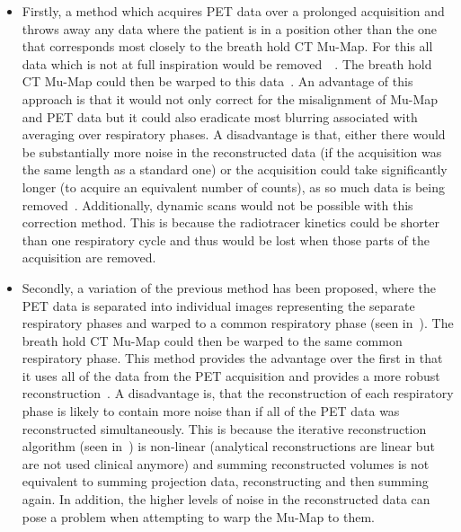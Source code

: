             \begin{itemize}
                \item Firstly, a method which acquires \gls{PET} data over a prolonged acquisition and throws away any data where the patient is in a position other than the one that corresponds most closely to the breath hold \gls{CT} \gls{Mu-Map}. For this all data which is not at full inspiration would be removed~~. %
                The breath hold \gls{CT} \gls{Mu-Map} could then be warped to this data~. An advantage of this approach is that it would not only correct for the misalignment of \gls{Mu-Map} and \gls{PET} data but it could also eradicate most blurring associated with averaging over respiratory phases. A disadvantage is that, either there would be substantially more noise in the reconstructed data (if the acquisition was the same length as a standard one) or the acquisition could take significantly longer (to acquire an equivalent number of counts), as so much data is being removed~. Additionally, dynamic scans would not be possible with this correction method. This is because the radiotracer kinetics could be shorter than one respiratory cycle and thus would be lost when those parts of the acquisition are removed.
                
                \item Secondly, a variation of the previous method has been proposed, where the \gls{PET} data is separated into individual images representing the separate respiratory phases and warped to a common respiratory phase (seen in~). The breath hold \gls{CT} \gls{Mu-Map} could then be warped to the same common respiratory phase. This method provides the advantage over the first in that it uses all of the data from the \gls{PET} acquisition and provides a more robust reconstruction~. A disadvantage is, that the reconstruction of each respiratory phase is likely to contain more noise than if all of the \gls{PET} data was reconstructed simultaneously. This is because the iterative reconstruction algorithm (seen in~) is non-linear (analytical reconstructions are linear but are not used clinical anymore) and summing reconstructed volumes is not equivalent to summing projection data, reconstructing and then summing again. %
                In addition, the higher levels of noise in the reconstructed data can pose a problem when attempting to warp the \gls{Mu-Map} to them.
                

\end{itemize}
